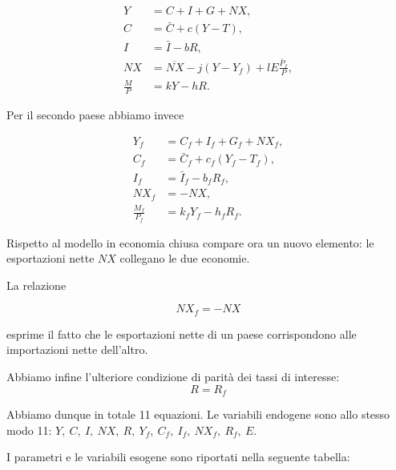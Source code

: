 \begin{align*}
    Y &= C+I+G+NX,\\
    C &= \bar C+c(Y-T),\\
    I &= \bar I-bR,\\
    NX &= \overline{NX}-j(Y-Y_f)
          +lE\frac{\bar P_f}{P},\\
    \frac{M}{P} &= kY-hR.
\end{align*}

Per il secondo paese abbiamo invece

\begin{align*}
    Y_f &= C_f+I_f+G_f+NX_f,\\
    C_f &= \bar C_f+c_f(Y_f-T_f),\\
    I_f &= \bar I_f-b_fR_f,\\
    NX_f &= -NX,\\
    \frac{M_f}{P_f} &= k_fY_f-h_fR_f.
\end{align*}

Rispetto al modello in economia chiusa compare ora un nuovo
elemento: le esportazioni nette $NX$ collegano le due economie.

La relazione

\begin{equation*}
    NX_f=-NX
\end{equation*}

esprime il fatto che le esportazioni nette di un paese
corrispondono alle importazioni nette dell'altro.

Abbiamo infine l'ulteriore condizione di parità dei tassi di interesse:
\[R=R_f\]

Abbiamo dunque in totale 11 equazioni. Le variabili endogene sono allo stesso modo 11: $Y,\ C,\ I,\ NX,\ R,\ Y_f,\ C_f,\ I_f,\ NX_f,\ R_f,\ E$.

I parametri e le variabili esogene sono riportati nella seguente tabella:

